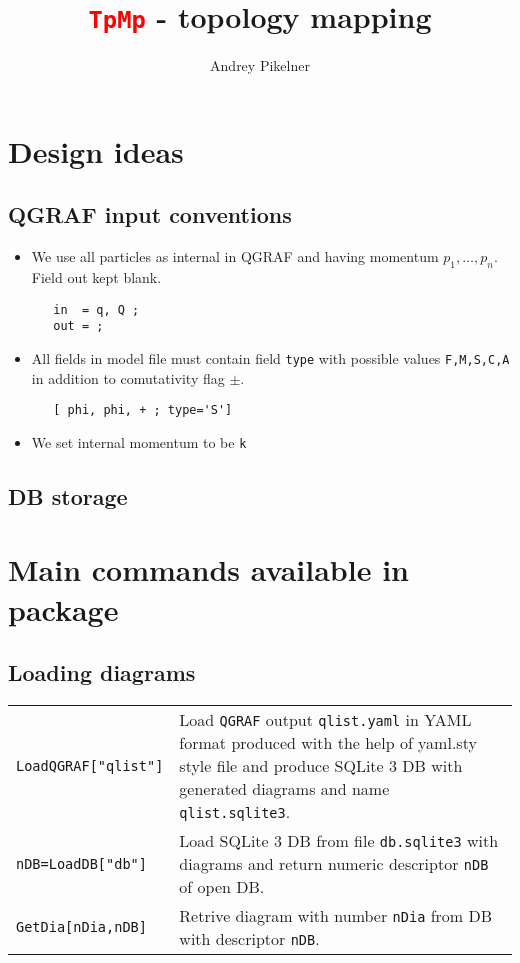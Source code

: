 \documentclass[a4paper,11pt]{article}
\title{\textcolor{red}{\texttt{\Huge TpMp}} - topology mapping}
\author{Andrey Pikelner}
\affil{II.~Institut f\"ur Theoretische Physik, Universit\"at Hamburg,\\
Luruper Chaussee 149, 22761 Hamburg, Germany}
\newcommand{\mma}[1]{\textcolor{BlueGreen}{\texttt{#1}}}
\newcommand{\ctt}[1]{\textcolor{OliveGreen}{\texttt{#1}}}
\begin{document}
 
\maketitle



\section*{Design ideas}

\subsection*{QGRAF input conventions}
\begin{itemize}
\item We use all particles as internal in QGRAF and having momentum
  $p_1,\dots,p_n$. Field out kept blank.
\begin{verbatim}
   in  = q, Q ;
   out = ;
\end{verbatim}

\item All fields in model file must contain field \ctt{type} with
  possible values \ctt{F,M,S,C,A} in addition to
  comutativity flag $\pm$.
\begin{verbatim}
   [ phi, phi, + ; type='S']
\end{verbatim}

\item We set internal momentum to be \ctt{k}
\end{itemize}


\subsection*{DB storage}
\label{sec:dbstore}


\section*{Main commands available in package }

\subsection*{Loading diagrams}
\begingroup
\renewcommand\arraystretch{2}
\begin{longtable}{p{4cm}|p{11cm}}
  \mma{LoadQGRAF["qlist"]}
  & Load \texttt{QGRAF}\cite{Nogueira:1991ex} output \texttt{qlist.yaml} in YAML format produced with the help of
    yaml.sty style file and produce SQLite 3 DB with generated
    diagrams and name \texttt{qlist.sqlite3}.\\
  \mma{nDB=LoadDB["db"]}
  & Load SQLite 3 DB from file \texttt{db.sqlite3} with diagrams and
    return numeric descriptor \texttt{nDB} of open DB.\\
  \mma{GetDia[nDia,nDB]}
  & Retrive diagram with number \texttt{nDia} from DB with descriptor
    \texttt{nDB}.\\
\end{longtable}
\endgroup
\end{document}
